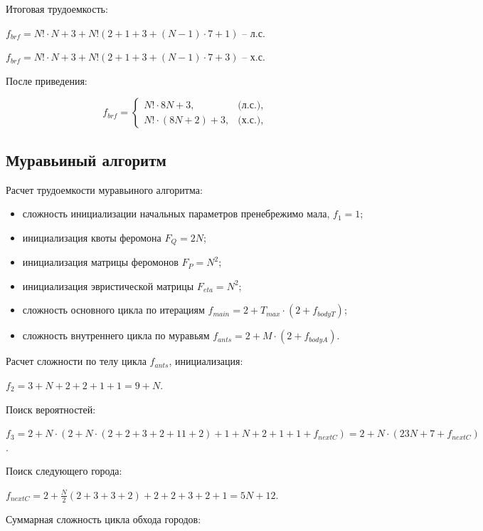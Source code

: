 Итоговая трудоемкость:

$f_{brf} = N! \cdot N + 3 + N!(2 + 1 + 3 + (N-1) \cdot 7 + 1)$ -- л.с.

$f_{brf} = N! \cdot N + 3 + N!(2 + 1 + 3 + (N-1) \cdot 7 + 3)$ -- х.с.

После приведения:

\begin{equation}
    \label{eq:ansbrf}
    f_{brf} =
    \begin{cases}
        N! \cdot 8N + 3, & \text{(л.с.),}\\
        N! \cdot (8N + 2) + 3, & \text{(х.с.),}
    \end{cases}
\end{equation}

\subsection{Муравьиный алгоритм}

Расчет трудоемкости муравьиного алгоритма:

\begin{itemize}
    \item сложность инициализации начальных параметров пренебрежимо мала, $f_{1} = 1$;
    \item инициализация квоты феромона $F_{Q} = 2N$;
    \item инициализация матрицы феромонов $F_{P} = N^2$;
    \item инициализация эвристической матрицы $F_{eta} = N^2$;
    \item сложность основного цикла по итерациям $f_{main} = 2 + T_{max} \cdot (2 + f_{bodyT})$;
    \item сложность внутреннего цикла по муравьям $f_{ants} = 2 + M \cdot (2 + f_{bodyA})$.
\end{itemize}

Расчет сложности по телу цикла $f_{ants}$, инициализация:

$f_{2} = 3 + N + 2 + 2 + 1 + 1 = 9 + N$.

Поиск вероятностей:

$f_{3} = 2 + N \cdot (2 + N \cdot (2 + 2 + 3 + 2 + 11 + 2) + 1 + N + 2 + 1 + 1 + f_{nextC}) = 2 + N \cdot(23N + 7 + f_{nextC})$.

Поиск следующего города:

$f_{nextC} = 2 + \frac{N}{2}(2 + 3 + 3 + 2) + 2 + 2 + 3 + 2 + 1 = 5N + 12$.

Суммарная сложность цикла обхода городов:

